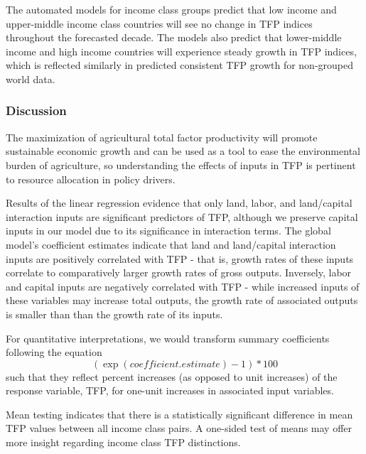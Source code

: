 \documentclass[
  letterpaper,
  DIV=11,
  numbers=noendperiod]{scrartcl}
\begin{document}
The automated models for income class groups predict that low income and
upper-middle income class countries will see no change in TFP indices
throughout the forecasted decade. The models also predict that
lower-middle income and high income countries will experience steady
growth in TFP indices, which is reflected similarly in predicted
consistent TFP growth for non-grouped world data.

\hypertarget{discussion}{%
\subsubsection{Discussion}\label{discussion}}

The maximization of agricultural total factor productivity will promote
sustainable economic growth and can be used as a tool to ease the
environmental burden of agriculture, so understanding the effects of
inputs in TFP is pertinent to resource allocation in policy drivers.

Results of the linear regression evidence that only land, labor, and
land/capital interaction inputs are significant predictors of TFP,
although we preserve capital inputs in our model due to its significance
in interaction terms. The global model's coefficient estimates indicate
that land and land/capital interaction inputs are positively correlated
with TFP - that is, growth rates of these inputs correlate to
comparatively larger growth rates of gross outputs. Inversely, labor and
capital inputs are negatively correlated with TFP - while increased
inputs of these variables may increase total outputs, the growth rate of
associated outputs is smaller than than the growth rate of its inputs.

For quantitative interpretations, we would transform summary
coefficients following the equation
\[(\exp(coefficient.estimate)-1)*100\] such that they reflect percent
increases (as opposed to unit increases) of the response variable, TFP,
for one-unit increases in associated input variables.

Mean testing indicates that there is a statistically significant
difference in mean TFP values between all income class pairs. A
one-sided test of means may offer more insight regarding income class
TFP distinctions.
\end{document}
